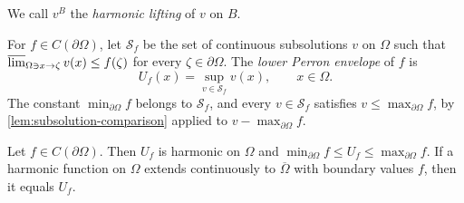 We call $v^B$ the \emph{harmonic lifting} of $v$ on $B$.

For $f\in C(\partial\Omega)$, let $\mathcal S_f$ be the set of continuous subsolutions $v$ on $\Omega$ such that $\varlimsup_{\Omega\ni x\to\zeta}v(x)\leq f(\zeta)$ for every $\zeta\in\partial\Omega$. The \emph{lower Perron envelope} of $f$ is
\[
 U_f(x)=\sup_{v\in\mathcal S_f}v(x),\qquad x\in\Omega.
\]
The constant $\min_{\partial\Omega}f$ belongs to $\mathcal S_f$, and every $v\in\mathcal S_f$ satisfies $v\leq\max_{\partial\Omega}f$, by \cref{lem:subsolution-comparison} applied to $v-\max_{\partial\Omega}f$.

\begin{theorem}\label{thm:perron-harmonic}
Let $f\in C(\partial\Omega)$. Then $U_f$ is harmonic on $\Omega$ and $\min_{\partial\Omega}f\leq U_f\leq\max_{\partial\Omega}f$. If a harmonic function on $\Omega$ extends continuously to $\overline\Omega$ with boundary values $f$, then it equals $U_f$.
\end{theorem}
